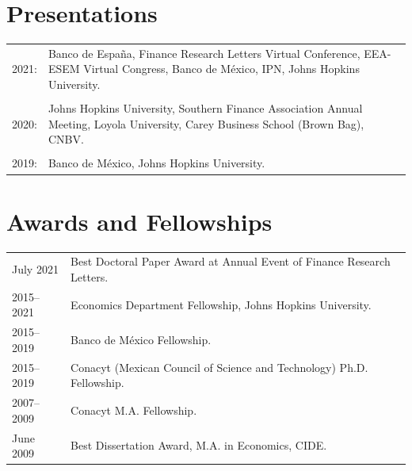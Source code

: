 \documentclass[12pt]{article}
\newcommand{\vsect}{\vspace{0.08cm}}
\begin{document}
	\pagestyle{fancy}
	
	\section{Presentations} 
	\vsect
	\begin{tabular}[l]{ll}
		2021: & \multirow{1}{15cm}{Banco de España, Finance Research Letters Virtual Conference, EEA-ESEM Virtual Congress, Banco de México, IPN, Johns Hopkins University.} \\ & \\ %
		2020: & \multirow{1}{15cm}{Johns Hopkins University, Southern Finance Association Annual Meeting, Loyola University, Carey Business School (Brown Bag), CNBV.} \\ & \\
		2019: & Banco de México,  Johns Hopkins University. \\
	\end{tabular}

	
	\section{Awards and Fellowships}
	\vsect
	\begin{tabular}[l]{ll}
		July 2021 & Best Doctoral Paper Award at Annual Event of Finance Research Letters. \\
		2015–2021 & Economics Department Fellowship, Johns Hopkins University. \\
		2015–2019 & Banco de México Fellowship. \\
		2015–2019 & Conacyt (Mexican Council of Science and Technology) Ph.D. Fellowship. \\
		2007–2009 & Conacyt M.A. Fellowship. \\
		June 2009 & Best Dissertation Award, M.A. in Economics, CIDE. \\
	\end{tabular}
\end{document}
